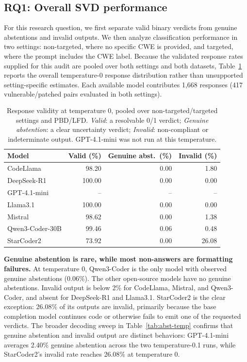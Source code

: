 \documentclass[lettersize,journal]{IEEEtran}
\begin{document}
\subsection{RQ1: Overall \gls{SVD} performance}
\label{section:rq1}

For this research question, we first separate valid binary verdicts from genuine abstentions and invalid outputs. We then analyze classification performance in two settings: non-targeted, where no specific CWE is provided, and targeted, where the prompt includes the CWE label. Because the validated response rates supplied for this audit are pooled over both settings and both datasets, Table~\ref{tab:abst-model-non-targeted} reports the overall temperature-0 response distribution rather than unsupported setting-specific estimates. Each available model contributes 1,668 responses (417 vulnerable/patched pairs evaluated in both settings).

\begin{table}[h]
\centering%
\caption{Response validity at temperature 0, pooled over non-targeted/targeted settings and PBD/LFD. \emph{Valid}: a resolvable 0/1 verdict; \emph{Genuine abstention}: a clear uncertainty verdict; \emph{Invalid}: non-compliant or indeterminate output. GPT-4.1-mini was not run at this temperature.}
\label{tab:abst-model-non-targeted}
\begin{tabular}{lrrr}
\hline
\textbf{Model} & \textbf{Valid (\%)} & \textbf{Genuine abst.\ (\%)} & \textbf{Invalid (\%)} \\
\hline
CodeLlama       & 98.20 & 0.00 & 1.80 \\
DeepSeek-R1     & 100.00 & 0.00 & 0.00 \\
GPT-4.1-mini    & -- & -- & -- \\
Llama3.1        & 100.00 & 0.00 & 0.00 \\
Mistral         & 98.62 & 0.00 & 1.38 \\
Qwen3-Coder-30B & 99.46 & 0.06 & 0.48 \\
StarCoder2      & 73.92 & 0.00 & 26.08 \\
\hline
\end{tabular}
\end{table}

\textbf{Genuine abstention is rare, while most non-answers are formatting failures.}
At temperature 0, Qwen3-Coder is the only model with observed genuine abstentions (0.06\%). The other open-source models have no genuine abstentions. Invalid output is below 2\% for CodeLlama, Mistral, and Qwen3-Coder, and absent for DeepSeek-R1 and Llama3.1. StarCoder2 is the clear exception: 26.08\% of its outputs are invalid, primarily because the base completion model continues code or otherwise fails to emit one of the requested verdicts. The broader decoding sweep in Table~\ref{tab:abst-temp} confirms that genuine abstention and invalid output are distinct behaviors: GPT-4.1-mini averages 2.40\% genuine abstention across the two temperature-0.1 runs, while StarCoder2's invalid rate reaches 26.08\% at temperature 0.
\end{document}
